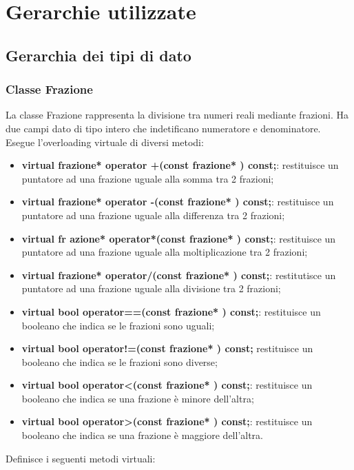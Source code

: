 \documentclass[a4paper,10pt]{article}
\begin{document}
	\section{Gerarchie utilizzate}
    \subsection{Gerarchia dei tipi di dato}
    \subsubsection{Classe Frazione}
        La classe Frazione rappresenta la divisione tra numeri reali mediante frazioni. Ha due campi dato di tipo intero che indetificano numeratore e denominatore. 
        \\Esegue l'overloading virtuale di diversi metodi:
        \begin{itemize}
            \item \textbf{virtual frazione*  operator +(const frazione*  ) const;}: restituisce un puntatore ad una frazione uguale alla somma tra 2 frazioni;
            \item \textbf{virtual frazione*  operator -(const frazione*  ) const;}: restituisce un puntatore ad una frazione uguale alla differenza tra 2 frazioni;
            \item \textbf{virtual fr
            azione*  operator*(const frazione*  ) const;}: restituisce un puntatore ad una frazione uguale alla moltiplicazione tra 2 frazioni;
            \item \textbf{virtual frazione*  operator/(const frazione*  ) const;}: restitutisce un puntatore ad una frazione uguale alla divisione tra 2 frazioni;
            \item \textbf{virtual bool operator==(const frazione*  ) const;}: restituisce un booleano che indica se le frazioni sono uguali;
            \item \textbf{virtual bool operator!=(const frazione*  ) const;} restituisce un booleano che indica se le frazioni sono diverse;
            \item \textbf{virtual bool operator<(const frazione*  ) const;}: restituisce un booleano che indica se una frazione è minore dell'altra;
            \item \textbf{virtual bool operator>(const frazione*  ) const;}: restituisce un booleano che indica se una frazione è maggiore dell'altra.
        \end{itemize}
        Definisce i seguenti metodi virtuali:
\end{document}
